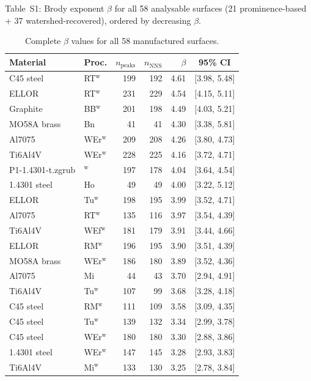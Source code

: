 \documentclass[final,3p,times,twocolumn]{elsarticle}
\theoremstyle{definition}
\begin{document}
Table~S1: Brody exponent $\beta$ for all 58 analysable surfaces
(21 prominence-based + 37 watershed-recovered), ordered by decreasing $\beta$.

\begin{table}[htbp]
  \centering
  \caption{Complete $\beta$ values for all 58 manufactured surfaces.}
  \label{tab:S1}
  \small
  \begin{tabular}{@{}llrrrc@{}}
    \toprule
    Material & Proc. & $n_{\text{peaks}}$ & $n_{\text{NNS}}$ & $\beta$ & 95\% CI \\
    \midrule
    C45 steel & RT$^{\text{w}}$ & 199 & 192 & 4.61 & [3.98, 5.48] \\
    ELLOR & RT$^{\text{w}}$ & 231 & 229 & 4.54 & [4.15, 5.11] \\
    Graphite & BB$^{\text{w}}$ & 201 & 198 & 4.49 & [4.03, 5.21] \\
    MO58A brass & Bn & 41 & 41 & 4.30 & [3.38, 5.81] \\
    Al7075 & WEr$^{\text{w}}$ & 209 & 208 & 4.26 & [3.80, 4.73] \\
    Ti6Al4V & WEr$^{\text{w}}$ & 228 & 225 & 4.16 & [3.72, 4.71] \\
    P1-1.4301-t.zgrub & $^{\text{w}}$ & 197 & 178 & 4.04 & [3.64, 4.54] \\
    1.4301 steel & Ho & 49 & 49 & 4.00 & [3.22, 5.12] \\
    ELLOR & Tu$^{\text{w}}$ & 198 & 195 & 3.99 & [3.52, 4.71] \\
    Al7075 & RT$^{\text{w}}$ & 135 & 116 & 3.97 & [3.54, 4.39] \\
    Ti6Al4V & WEf$^{\text{w}}$ & 181 & 179 & 3.91 & [3.44, 4.66] \\
    ELLOR & RM$^{\text{w}}$ & 196 & 195 & 3.90 & [3.51, 4.39] \\
    MO58A brass & WEr$^{\text{w}}$ & 186 & 180 & 3.89 & [3.52, 4.36] \\
    Al7075 & Mi & 44 & 43 & 3.70 & [2.94, 4.91] \\
    Ti6Al4V & Tu$^{\text{w}}$ & 107 & 99 & 3.68 & [3.28, 4.18] \\
    C45 steel & RM$^{\text{w}}$ & 111 & 109 & 3.58 & [3.09, 4.35] \\
    C45 steel & Tu$^{\text{w}}$ & 139 & 132 & 3.34 & [2.99, 3.78] \\
    C45 steel & WEr$^{\text{w}}$ & 180 & 180 & 3.30 & [2.88, 3.86] \\
    1.4301 steel & WEr$^{\text{w}}$ & 147 & 145 & 3.28 & [2.93, 3.83] \\
    Ti6Al4V & Mi$^{\text{w}}$ & 133 & 130 & 3.25 & [2.78, 3.84] \\

\end{tabular}
\end{table}
\end{document}
